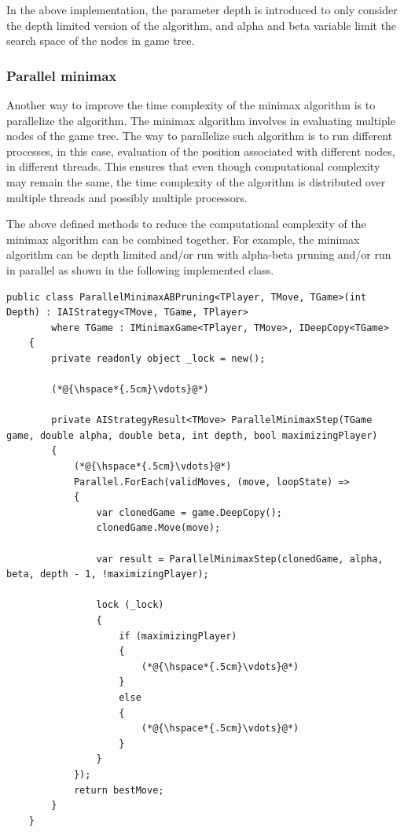 In the above implementation, the parameter depth is introduced to only consider the depth limited version of the algorithm, and alpha and beta variable limit the search space of the nodes in game tree.

\subsubsection{Parallel minimax}
Another way to improve the time complexity of the minimax algorithm is to parallelize the algorithm. The minimax algorithm involves in evaluating multiple nodes of the game tree. The way to parallelize such algorithm is to run different processes, in this case, evaluation of the position associated with different nodes, in different threads. This ensures that even though computational complexity may remain the same, the time complexity of the algorithm is distributed over multiple threads and possibly multiple processors.

The above defined methods to reduce the computational complexity of the minimax algorithm can be combined together. For example, the minimax algorithm can be depth limited and/or run with alpha-beta pruning and/or run in parallel as shown in the following implemented class.

\begin{lstlisting}
public class ParallelMinimaxABPruning<TPlayer, TMove, TGame>(int Depth) : IAIStrategy<TMove, TGame, TPlayer>
        where TGame : IMinimaxGame<TPlayer, TMove>, IDeepCopy<TGame>
    {
        private readonly object _lock = new();
        
        (*@{\hspace*{.5cm}\vdots}@*)
        
        private AIStrategyResult<TMove> ParallelMinimaxStep(TGame game, double alpha, double beta, int depth, bool maximizingPlayer)
        {
            (*@{\hspace*{.5cm}\vdots}@*)
            Parallel.ForEach(validMoves, (move, loopState) =>
            {
                var clonedGame = game.DeepCopy();
                clonedGame.Move(move);

                var result = ParallelMinimaxStep(clonedGame, alpha, beta, depth - 1, !maximizingPlayer);

                lock (_lock)
                {
                    if (maximizingPlayer)
                    {
                        (*@{\hspace*{.5cm}\vdots}@*)
                    }
                    else
                    {
                        (*@{\hspace*{.5cm}\vdots}@*)
                    }
                }
            });
            return bestMove;
        }
    }
\end{lstlisting}


